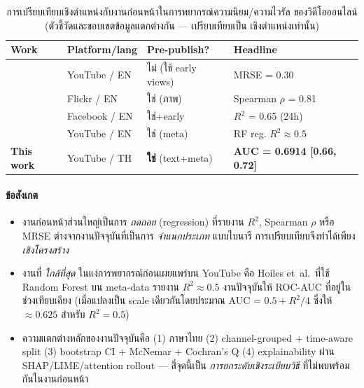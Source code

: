 \begin{table}[H]
\centering
\caption{การเปรียบเทียบเชิงตำแหน่งกับงานก่อนหน้าในการพยากรณ์ความนิยม/ความไวรัล
ของวิดีโอออนไลน์ (ตัวชี้วัดและขอบเขตข้อมูลแตกต่างกัน — เปรียบเทียบเป็น
เชิงตำแหน่งเท่านั้น)}
\label{tab:prior-works}
\small
\begin{tabularx}{\textwidth}{p{3.2cm}p{2.6cm}p{2.6cm}X}
\toprule
\textbf{Work} & \textbf{Platform/lang} & \textbf{Pre-publish?} & \textbf{Headline} \\
\midrule
\textcite{pinto2013using}        & YouTube / EN  & ไม่ (ใช้ early views) & MRSE = 0.30 \\
\textcite{khosla2014popularity} & Flickr / EN   & ใช่ (ภาพ) & Spearman $\rho$ = 0.81 \\
\textcite{trzcinski2017popularity} & Facebook / EN & ใช่+early & $R^2$ = 0.65 (24h) \\
\textcite{hoiles2017engagement} & YouTube / EN  & ใช่ (meta) & RF reg. $R^2 \approx 0.5$ \\
\midrule
\textbf{This work} & YouTube / TH & \textbf{ใช่} (text+meta) & \textbf{AUC = 0.6914 [0.66, 0.72]} \\
\bottomrule
\end{tabularx}
\end{table}

\paragraph{ข้อสังเกต}
\begin{itemize}[leftmargin=2em]
  \item งานก่อนหน้าส่วนใหญ่เป็นการ \emph{ถดถอย} (regression) ที่รายงาน $R^2$,
        Spearman $\rho$ หรือ MRSE ต่างจากงานปัจจุบันที่เป็นการ
        \emph{จำแนกประเภท} แบบไบนารี การเปรียบเทียบจึงทำได้เพียง
        \emph{เชิงโครงสร้าง}
  \item งานที่ \emph{ใกล้ที่สุด} ในแง่การพยากรณ์ก่อนเผยแพร่บน YouTube คือ
        Hoiles et~al.\ ที่ใช้ Random Forest บน meta-data รายงาน $R^2 \approx 0.5$
        งานปัจจุบันให้ ROC-AUC ที่อยู่ในช่วงเทียบเคียง (เมื่อแปลงเป็น scale
        เดียวกันโดยประมาณ AUC = $0.5 + R^2/4$ ซึ่งให้ $\approx 0.625$ สำหรับ
        $R^2 = 0.5$)
  \item ความแตกต่างหลักของงานปัจจุบันคือ (1) ภาษาไทย (2) channel-grouped +
        time-aware split (3) bootstrap CI + McNemar + Cochran's Q (4)
        explainability ผ่าน SHAP/LIME/attention rollout — สี่จุดนี้เป็น
        \emph{การยกระดับเชิงระเบียบวิธี} ที่ไม่พบพร้อมกันในงานก่อนหน้า
\end{itemize}

